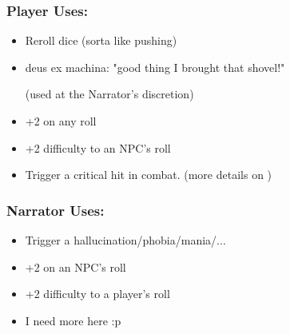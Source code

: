 \subsubsection{Player Uses:}
\begin{itemize}[topsep=0pt]
    \item Reroll dice (sorta like pushing)
    \item deus ex machina: "good thing I brought that shovel!" \par(used at the Narrator's discretion)
    \item +2 on any roll
    \item +2 difficulty to an NPC's roll
    \item Trigger a critical hit in combat. (more details on )
\end{itemize}

\subsubsection{Narrator Uses:}
\begin{itemize}[topsep=0pt]
    \item Trigger a hallucination/phobia/mania/...
    \item +2 on an NPC's roll
    \item +2 difficulty to a player's roll
    \item I need more here :p
\end{itemize}


